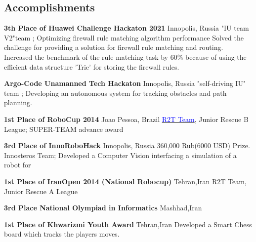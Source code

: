
\subsection{\textbf{Accomplishments}}

{\textbf{3th Place of Huawei Challenge Hackaton 2021}}
{Innopolis, Russia}
{}
{}
{
"IU team V2"team ; Optimizing firewall rule matching algorithm performance
Solved the challenge for providing a solution for firewall rule matching and routing. 
        Increased the benchmark of the rule matching task by 60\% because of using the efficient data structure 'Trie' for storing the firewall rules. 
 }

{\textbf{Argo-Code Unamanned Tech Hackaton }}
{Innopolis, Russia}
{}
{}
{
"self-driving IU" team ; Developing an autonomous system for tracking obstacles and path planning. 
} 
 
{\textbf{1st Place of RoboCup 2014}}
{Joao Pessoa, Brazil}
{}
{}
{
\href{http://www.robocup2014.org/?page_id=3318}{\textcolor{blue}{R2T Team}}, Junior Rescue B League; SUPER-TEAM advance award}


{\textbf{3rd Place of InnoRoboHack }}
{Innopolis, Russia}
{}
{}
{
360,000 Rub(6000 USD) Prize.
Innosteros Team; Developed a Computer Vision interfacing a simulation of a robot for 
}
 
 
{\textbf{1st Place of IranOpen 2014 (National Robocup)}}
{Tehran,Iran}
{}
{}
{
	R2T Team, Junior Rescue A League
}

{\textbf{3rd Place National Olympiad in Informatics }}
{Mashhad,Iran}
{}
{}
{	
}

{\textbf{1st Place of Khwarizmi Youth Award }}
{Tehran,Iran}
{}
{}
{
    Developed a Smart Chess board which tracks the players moves.
}



